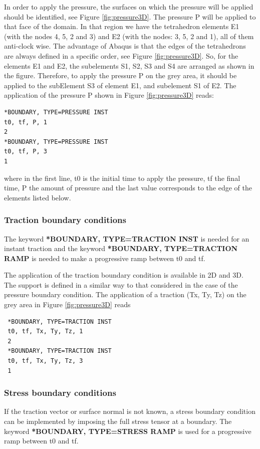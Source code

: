 \documentclass[oneside,11pt,times]{book}
\begin{document}
 In order to apply the pressure, the surfaces on which the pressure will be applied should be identified, see Figure \ref{fig:pressure3D}. The pressure P will be applied to that face of the domain. In that region we have the tetrahedron elements E1 (with the nodes 4, 5, 2 and 3) and E2 (with the nodes: 3, 5, 2 and 1), all of them anti-clock wise. The advantage of Abaqus is that the edges of the tetrahedrons are always defined in a specific order, see Figure \ref{fig:pressure3D}. So, for the elements E1 and E2, the subelements S1, S2, S3 and S4 are arranged as shown in the figure. Therefore, to apply the pressure P on the grey area, it should be applied to the subElement S3 of element E1, and subelement S1 of E2. The application of the pressure P shown in Figure \ref{fig:pressure3D} reads:
\begin{lstlisting}
*BOUNDARY, TYPE=PRESSURE INST
t0, tf, P, 1
2
*BOUNDARY, TYPE=PRESSURE INST
t0, tf, P, 3
1
\end{lstlisting}

 where in the first line, t0 is the initial time to apply the pressure, tf the final time, P the amount of pressure and the last value corresponds to the edge of the elements listed below.

 \subsubsection{Traction boundary conditions}

 The keyword \textbf{*BOUNDARY, TYPE=TRACTION INST} is needed for an instant traction and the keyword \textbf{*BOUNDARY, TYPE=TRACTION RAMP} is needed to make a progressive ramp between t0 and tf.

 The application of the traction boundary condition is available in 2D and 3D. The support is defined in a similar way to that considered in the case of the pressure boundary condition. The application of a traction (Tx, Ty, Tz) on the grey area in Figure \ref{fig:pressure3D} reads
 \begin{lstlisting}
 *BOUNDARY, TYPE=TRACTION INST
 t0, tf, Tx, Ty, Tz, 1
 2
 *BOUNDARY, TYPE=TRACTION INST
 t0, tf, Tx, Ty, Tz, 3
 1
 \end{lstlisting}

 \subsubsection{Stress boundary conditions}

If the traction vector or surface normal is not known, a stress boundary condition can be implemented by imposing the full stress tensor at a boundary. The keyword \textbf{*BOUNDARY, TYPE=STRESS RAMP} is used for a progressive ramp between t0 and tf.
\end{document}
